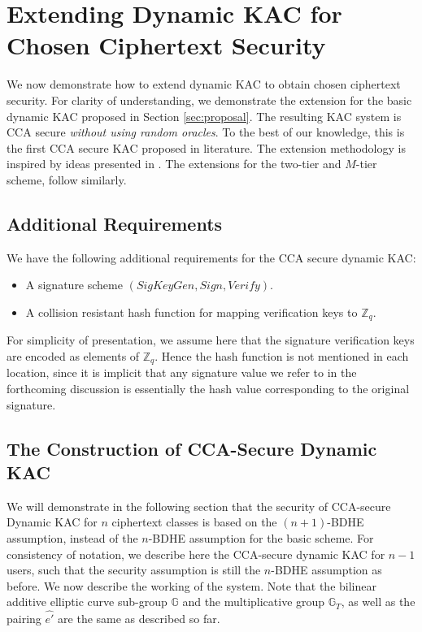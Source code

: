 \section{Extending Dynamic KAC for Chosen Ciphertext Security}
\label{sec:CCA}

We now demonstrate how to extend dynamic KAC to obtain chosen ciphertext security. For clarity of understanding, we demonstrate the extension for the basic dynamic KAC proposed in Section \ref{sec:proposal}. The resulting KAC system is CCA secure \emph{without using random oracles}. To the best of our knowledge, this is the first CCA secure KAC proposed in literature. The extension methodology is inspired by ideas presented in \cite{boneh2005collusion}. The extensions for the two-tier and $M$-tier scheme, follow similarly.

\subsection{Additional Requirements}
\label{subsec:additional}

We have the following additional requirements for the CCA secure dynamic KAC:

\begin{itemize}
 \item A signature scheme $(SigKeyGen,Sign,Verify)$. 
 \item A collision resistant hash function for mapping verification keys to $\mathbb{Z}_q$. 
\end{itemize}

For simplicity of presentation, we assume here that the signature verification keys are encoded as elements of $\mathbb{Z}_q$. Hence the hash function is not mentioned in each location, since it is implicit that any signature value we refer to in the forthcoming discussion is essentially the hash value corresponding to the original signature.

\subsection{The Construction of CCA-Secure Dynamic KAC}
\label{subsec:construction_CCA}

We will demonstrate in the following section that the security of CCA-secure Dynamic KAC for $n$ ciphertext classes is based on the $(n+1)$-BDHE assumption, instead of the $n$-BDHE assumption for the basic scheme. For consistency of notation, we describe here the CCA-secure dynamic KAC for $n-1$ users, such that the security assumption is still the $n$-BDHE assumption as before. We now describe the working of the system. Note that the bilinear additive elliptic curve sub-group $\mathbb{G}$ and the multiplicative group $\mathbb{G}_T$, as well as the pairing $\hat{e'}$ are the same as described so far. 

